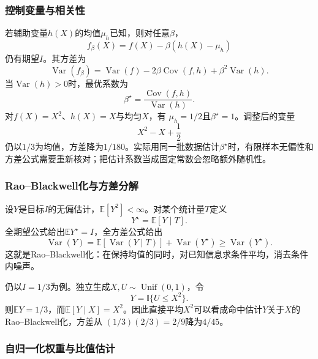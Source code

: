 \subsubsection{控制变量与相关性}

若辅助变量\(h(X)\)的均值\(\mu_h\)已知，则对任意\(\beta\)，
\[ f_\beta(X)
  =f(X)-\beta(h(X)-\mu_h) \]
仍有期望\(I\)。其方差为
\[ \operatorname{Var}(f_\beta)
  =\operatorname{Var}(f)-2\beta\operatorname{Cov}(f,h)+\beta^2\operatorname{Var}(h). \]
当\(\operatorname{Var}(h)>0\)时，最优系数为
\[ \beta^\star
  =\frac{\operatorname{Cov}(f,h)}{\operatorname{Var}(h)}. \]
对\(f(X)=X^2\)、\(h(X)=X\)与均匀\(X\)，有
\(\mu_h=1/2\)且\(\beta^\star=1\)。调整后的变量
\[ X^2-X+\frac12 \]
仍以\(1/3\)为均值，方差降为\(1/180\)。实际用同一批数据估计\(\beta^\star\)时，有限样本无偏性和方差公式需要重新核对；把估计系数当成固定常数会忽略额外随机性。

\subsubsection{Rao--Blackwell化与方差分解}

设\(Y\)是目标\(I\)的无偏估计，\(\mathbb{E}[Y^2]<\infty\)。对某个统计量\(T\)定义
\[ Y^\star=\mathbb{E}[Y\mid T]. \]
全期望公式给出\(\mathbb{E}Y^\star=I\)，全方差公式给出
\begin{equation}
  \operatorname{Var}(Y)
  =
  \mathbb{E}[\operatorname{Var}(Y\mid T)]
  +
  \operatorname{Var}(Y^\star)
  \geq
  \operatorname{Var}(Y^\star).
  \label{eq:probability-rao-blackwell-variance}
\end{equation}
这就是Rao--Blackwell化：在保持均值的同时，对已知信息求条件平均，消去条件内噪声。

仍以\(I=1/3\)为例。独立生成\(X,U\sim\operatorname{Unif}(0,1)\)，令
\[ Y=\mathbb{I}\{U\leq X^2\}. \]
则\(\mathbb{E}Y=1/3\)，而\(\mathbb{E}[Y\mid X]=X^2\)。因此直接平均\(X^2\)可以看成命中估计\(Y\)关于\(X\)的Rao--Blackwell化，方差从
\((1/3)(2/3)=2/9\)降为\(4/45\)。

\subsubsection{自归一化权重与比值估计}


